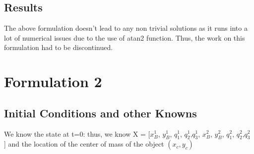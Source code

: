\documentclass[12pt,english]{report}
\begin{document}
\subsection{Results}
The above formulation doesn't lead to any non trivial solutions as it runs into a lot of numerical issues due to the use of atan2 function. Thus, the work on this formulation had to be discontinued. 

\section{Formulation 2}
\subsection{Initial Conditions and other Knowns}
We know the state at t=0: thus, we know X = [$x_B^1$, $y_B^1$, $q_1^1$, $q_2^1$,$q_3^1$, $x_B^2$, $y_B^2$, $q_1^2$, $q_2^2$,$q_3^2$ ] and the location of the center of mass of the object $(x_c, y_c)$
\end{document}
